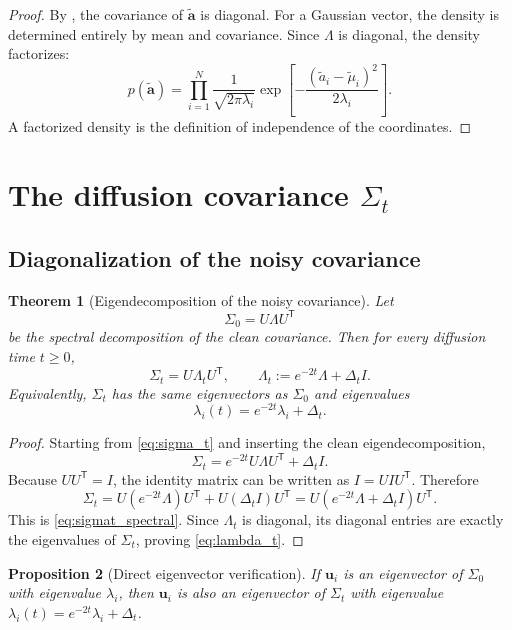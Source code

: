 \documentclass[11pt]{article}
\numberwithin{equation}{section}
\newtheorem{theorem}{Theorem}[section]
\newtheorem{proposition}[theorem]{Proposition}
\theoremstyle{definition}
\theoremstyle{remark}
\newcommand{\Id}{I}
\newcommand{\trans}{\mathsf{T}}
\begin{document}
\begin{proof}
By , the covariance of $\widetilde{\mathbf a}$ is diagonal. For a Gaussian vector, the density is determined entirely by mean and covariance. Since $\Lambda$ is diagonal, the density factorizes:
\[
p(\widetilde{\mathbf a})
=
\prod_{i=1}^N
\frac{1}{\sqrt{2\pi\lambda_i}}
\exp\!\left[-\frac{(\widetilde a_i-\widetilde\mu_i)^2}{2\lambda_i}\right].
\]
A factorized density is the definition of independence of the coordinates.
\end{proof}

\section{The diffusion covariance \texorpdfstring{$\Sigma_t$}{Sigma t}}\label{sec:sigmat}

\subsection{Diagonalization of the noisy covariance}

\begin{theorem}[Eigendecomposition of the noisy covariance]\label{thm:sigmat_spectral}
Let
\[
\Sigma_0=U\Lambda U^\trans
\]
be the spectral decomposition of the clean covariance. Then for every diffusion time $t\geq 0$,
\begin{equation}\label{eq:sigmat_spectral}
\Sigma_t = U\Lambda_t U^\trans,
\qquad
\Lambda_t:=e^{-2t}\Lambda+\Delta_t\Id.
\end{equation}
Equivalently, $\Sigma_t$ has the same eigenvectors as $\Sigma_0$ and eigenvalues
\begin{equation}\label{eq:lambda_t}
\lambda_i(t)=e^{-2t}\lambda_i+\Delta_t.
\end{equation}
\end{theorem}

\begin{proof}
Starting from \eqref{eq:sigma_t} and inserting the clean eigendecomposition,
\[
\Sigma_t=e^{-2t}U\Lambda U^\trans+\Delta_t\Id.
\]
Because $UU^\trans=\Id$, the identity matrix can be written as $\Id=U\Id U^\trans$. Therefore
\[
\Sigma_t
=
U(e^{-2t}\Lambda)U^\trans + U(\Delta_t\Id)U^\trans
=
U(e^{-2t}\Lambda+\Delta_t\Id)U^\trans.
\]
This is \eqref{eq:sigmat_spectral}. Since $\Lambda_t$ is diagonal, its diagonal entries are exactly the eigenvalues of $\Sigma_t$, proving \eqref{eq:lambda_t}.
\end{proof}

\begin{proposition}[Direct eigenvector verification]\label{prop:same_evecs}
If $\mathbf u_i$ is an eigenvector of $\Sigma_0$ with eigenvalue $\lambda_i$, then $\mathbf u_i$ is also an eigenvector of $\Sigma_t$ with eigenvalue $\lambda_i(t)=e^{-2t}\lambda_i+\Delta_t$.
\end{proposition}
\end{document}
